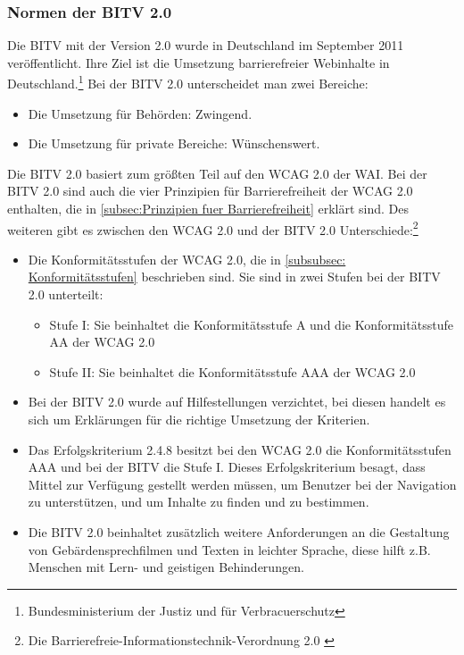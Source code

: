 \subsubsection{Normen der \ac{BITV} 2.0}
Die \ac{BITV} mit der Version 2.0 wurde in Deutschland im September 2011 veröffentlicht. Ihre Ziel ist die Umsetzung barrierefreier Webinhalte in Deutschland.\footnote{Bundesministerium der Justiz und für Verbracuerschutz\cite{BITV}} Bei der \ac{BITV} 2.0 unterscheidet man zwei Bereiche:

\begin{itemize}
	\item Die Umsetzung für Behörden: Zwingend.
	\item Die Umsetzung für private Bereiche: Wünschenswert.
\end{itemize}

Die \ac{BITV} 2.0 basiert zum größten Teil auf den \ac{WCAG} 2.0 der \ac{WAI}. Bei der \ac{BITV} 2.0 sind auch die vier Prinzipien für Barrierefreiheit der \ac{WCAG} 2.0  enthalten, die in \cref{subsec:Prinzipien fuer Barrierefreiheit} erklärt sind. Des weiteren gibt es zwischen den \ac{WCAG} 2.0 und der \ac{BITV} 2.0 Unterschiede:\footnote{Die Barrierefreie-Informationstechnik-Verordnung 2.0 \cite{BITV}}

\begin{itemize}
	\item Die Konformitätsstufen der \ac{WCAG} 2.0, die in \cref{subsubsec: Konformitätsstufen} beschrieben sind. Sie sind in zwei Stufen bei 
	der \ac{BITV} 2.0 unterteilt:
		\begin{itemize}
			\item Stufe I: Sie beinhaltet die Konformitätsstufe A und die Konformitätsstufe AA der \ac{WCAG} 2.0
			\item Stufe II: Sie beinhaltet die Konformitätsstufe AAA der \ac{WCAG} 2.0
		\end{itemize}
	
	\item Bei der \ac{BITV} 2.0 wurde auf Hilfestellungen verzichtet, bei diesen handelt es sich um Erklärungen für die richtige Umsetzung der Kriterien.
	
	\item Das Erfolgskriterium 2.4.8 besitzt bei den \ac{WCAG} 2.0 die Konformitätsstufen AAA und bei der \ac{BITV} die Stufe I. Dieses Erfolgskriterium besagt, dass 
	Mittel zur Verfügung gestellt werden müssen, um Benutzer bei der Navigation zu unterstützen, und um Inhalte zu finden und zu bestimmen.
	
	\item Die \ac{BITV} 2.0 beinhaltet zusätzlich weitere Anforderungen an die Gestaltung von Gebärdensprechfilmen und Texten in leichter Sprache, diese hilft
	z.B. Menschen mit Lern- und geistigen Behinderungen.
\end{itemize}

